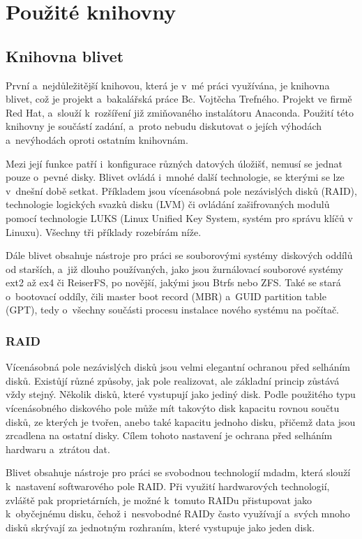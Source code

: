 \documentclass[color,table,oneside,nolot,nolof]{fithesis}
\begin{document}
\chapter{Použité knihovny}
\section{Knihovna blivet}
	První a~nejdůležitější knihovou, která je v~mé práci využívána, je knihovna blivet, což je projekt a~bakalářská práce Bc. Vojtěcha Trefného. Projekt 
	ve firmě Red Hat, a~slouží k~rozšíření již zmiňovaného instalátoru Anaconda. Použití této knihovny je součástí zadání, a~proto nebudu diskutovat o jejích výhodách a~nevýhodách
	oproti ostatním knihovnám. 

	Mezi její funkce patří i~konfigurace různých datových úložišť, nemusí se jednat pouze o~pevné disky.
	Blivet ovládá i~mnohé další technologie, se kterými se lze v~dnešní době setkat. Příkladem jsou vícenásobná pole nezávislých disků (RAID), technologie logických svazků disku (LVM) či 
	ovládání zašifrovaných modulů pomocí technologie LUKS (Linux Unified Key System, systém pro správu klíčů v Linuxu). Všechny tři příklady rozebírám níže.

	Dále blivet obsahuje nástroje pro práci se souborovými systémy diskových oddílů od starších, a~již dlouho používaných, jako jsou žurnálovací souborové systémy ext2 až ex4 či ReiserFS, po novější,
	jakými jsou Btrfs nebo ZFS. Také se stará o~bootovací oddíly, čili master boot record (MBR) a~GUID partition table (GPT), tedy o~všechny součásti procesu instalace
	nového systému na počítač.

\subsection{RAID}
	Vícenásobná pole nezávislých disků jsou velmi elegantní ochranou před selháním disků. Existůjí různé způsoby, jak pole realizovat, ale základní princip zůstává vždy stejný. 
	Několik disků, které vystupují jako jediný disk. Podle použitého typu vícenásobného diskového pole může mít takovýto disk kapacitu rovnou součtu disků, ze kterých je tvořen, anebo také
	kapacitu jednoho disku, přičemž data jsou zrcadlena na ostatní disky. Cílem tohoto nastavení je ochrana před selháním hardwaru a~ztrátou dat. 
	
	Blivet obsahuje nástroje pro práci se svobodnou technologií mdadm, která slouží k~nastavení softwarového pole RAID. Při využití hardwarových technologií, zvláště pak proprietárních,
	je možné k~tomuto RAIDu přistupovat jako k~obyčejnému disku, čehož i~nesvobodné RAIDy často využívají a~svých mnoho disků skrývají za jednotným rozhraním, které vystupuje jako jeden
	disk. 
\end{document}
